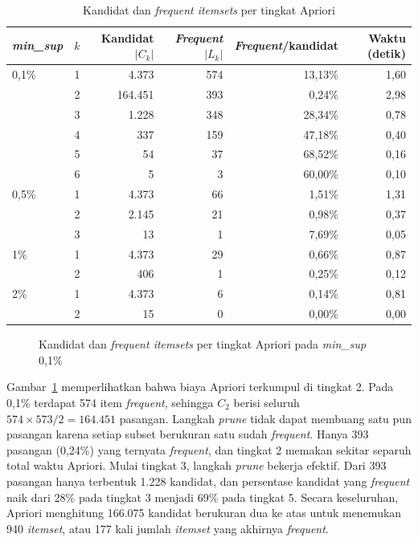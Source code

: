 \begin{table}[ht]
\caption{Kandidat dan \textit{frequent itemsets} per tingkat Apriori}
\label{tab:t4-apriori-level}
\small
\begin{tabular}{@{}lrrrrr@{}}
\toprule
\textbf{\textit{min\_sup}} & \textbf{$k$} & \textbf{Kandidat $|C_k|$} & \textbf{\textit{Frequent} $|L_k|$} & \textbf{\textit{Frequent}/kandidat} & \textbf{Waktu (detik)} \\
\midrule
0,1\% & 1 & 4.373 & 574 & 13,13\% & 1,60 \\
 & 2 & 164.451 & 393 & 0,24\% & 2,98 \\
 & 3 & 1.228 & 348 & 28,34\% & 0,78 \\
 & 4 & 337 & 159 & 47,18\% & 0,40 \\
 & 5 & 54 & 37 & 68,52\% & 0,16 \\
 & 6 & 5 & 3 & 60,00\% & 0,10 \\
\midrule
0,5\% & 1 & 4.373 & 66 & 1,51\% & 1,31 \\
 & 2 & 2.145 & 21 & 0,98\% & 0,37 \\
 & 3 & 13 & 1 & 7,69\% & 0,05 \\
\midrule
1\% & 1 & 4.373 & 29 & 0,66\% & 0,87 \\
 & 2 & 406 & 1 & 0,25\% & 0,12 \\
\midrule
2\% & 1 & 4.373 & 6 & 0,14\% & 0,81 \\
 & 2 & 15 & 0 & 0,00\% & 0,00 \\
\bottomrule
\end{tabular}
\end{table}

\begin{figure}[ht]
\centering
{}
\caption{Kandidat dan \textit{frequent itemsets} per tingkat Apriori pada \textit{min\_sup} 0,1\%}
\label{fig:t4-apriori-kandidat}
\end{figure}

Gambar~\ref{fig:t4-apriori-kandidat} memperlihatkan bahwa biaya Apriori terkumpul di tingkat 2. Pada 0,1\% terdapat 574 item \textit{frequent}, sehingga $C_2$ berisi seluruh $574 \times 573 / 2 = 164.451$ pasangan. Langkah \textit{prune} tidak dapat membuang satu pun pasangan karena setiap subset berukuran satu sudah \textit{frequent}. Hanya 393 pasangan (0,24\%) yang ternyata \textit{frequent}, dan tingkat 2 memakan sekitar separuh total waktu Apriori. Mulai tingkat 3, langkah \textit{prune} bekerja efektif. Dari 393 pasangan hanya terbentuk 1.228 kandidat, dan persentase kandidat yang \textit{frequent} naik dari 28\% pada tingkat 3 menjadi 69\% pada tingkat 5. Secara keseluruhan, Apriori menghitung 166.075 kandidat berukuran dua ke atas untuk menemukan 940 \textit{itemset}, atau 177 kali jumlah \textit{itemset} yang akhirnya \textit{frequent}.


